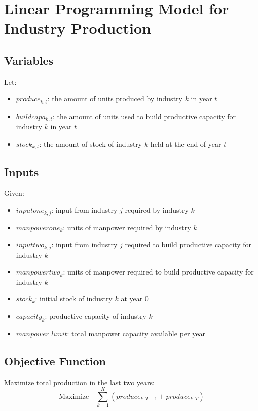 \documentclass{article}
\begin{document}
\section*{Linear Programming Model for Industry Production}

\subsection*{Variables}
Let:
\begin{itemize}
    \item \( produce_{k, t} \): the amount of units produced by industry \( k \) in year \( t \)
    \item \( buildcapa_{k, t} \): the amount of units used to build productive capacity for industry \( k \) in year \( t \)
    \item \( stock_{k, t} \): the amount of stock of industry \( k \) held at the end of year \( t \)
\end{itemize}

\subsection*{Inputs}
Given:
\begin{itemize}
    \item \( inputone_{k, j} \): input from industry \( j \) required by industry \( k \)
    \item \( manpowerone_{k} \): units of manpower required by industry \( k \)
    \item \( inputtwo_{k, j} \): input from industry \( j \) required to build productive capacity for industry \( k \)
    \item \( manpowertwo_{k} \): units of manpower required to build productive capacity for industry \( k \)
    \item \( stock_{k} \): initial stock of industry \( k \) at year 0
    \item \( capacity_{k} \): productive capacity of industry \( k \)
    \item \( manpower\_limit \): total manpower capacity available per year
\end{itemize}

\subsection*{Objective Function}
Maximize total production in the last two years:
\[
\text{Maximize} \quad \sum_{k=1}^{K} (produce_{k, T-1} + produce_{k, T})
\]
\end{document}
